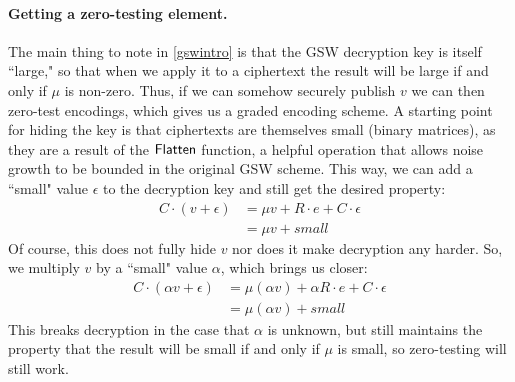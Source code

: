 \paragraph{Getting a zero-testing element.}
The main thing to note in \eqref{gswintro} is that the GSW decryption key is itself ``large," so that when we apply it to a ciphertext the result will be large if and only if $\mu$ is non-zero.  Thus, if we can somehow securely publish $v$ we can then zero-test encodings, which gives us a graded encoding scheme.  A starting point for hiding the key is that ciphertexts are themselves small (binary matrices), as they are a result of the $\mathsf{Flatten}$ function, a helpful operation that allows noise growth to be bounded in the original GSW scheme.  This way, we can add a ``small" value $\epsilon$ to the decryption key and still get the desired property:
\begin{align*}
C\cdot(v + \epsilon) &= \mu v + R\cdot e + C\cdot \epsilon \\
&= \mu v + small
\end{align*}
Of course, this does not fully hide $v$ nor does it make decryption any harder.  So, we multiply $v$ by a ``small" value $\alpha$, which brings us closer:
\begin{align*}
C\cdot(\alpha v + \epsilon) &= \mu (\alpha v) + \alpha R\cdot e + C\cdot \epsilon \\
&= \mu (\alpha v) + small
\end{align*}
This breaks decryption in the case that $\alpha$ is unknown, but still maintains the property that the result will be small if and only if $\mu$ is small, so zero-testing will still work.